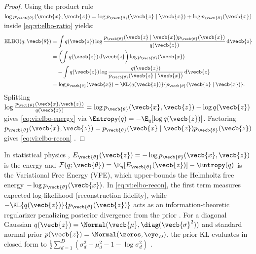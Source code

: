 \documentclass[../../../../master.tex]{subfiles}
\begin{document}
\begin{proof}
Using the product rule $\log p_{\vecb{\theta}}(\vecb{x}, \vecb{z}) = \log p_{\vecb{\theta}}(\vecb{z} \mid \vecb{x}) + \log p_{\vecb{\theta}}(\vecb{x})$ inside \eqref{eq:vi:elbo-ratio} yields:
\begin{align*}
  \mathrm{ELBO}(q; \vecb{\theta}) &= \int q(\vecb{z}) \log \frac{p_{\vecb{\theta}}(\vecb{z} \mid \vecb{x}) p_{\vecb{\theta}}(\vecb{x})}{q(\vecb{z})}\,\mathrm{d}\vecb{z} \\
  &= \left(\int q(\vecb{z})\,\mathrm{d}\vecb{z}\right) \log p_{\vecb{\theta}}(\vecb{x}) \\
  &\quad - \int q(\vecb{z}) \log \frac{q(\vecb{z})}{p_{\vecb{\theta}}(\vecb{z} \mid \vecb{x})}\,\mathrm{d}\vecb{z} \\
  &= \log p_{\vecb{\theta}}(\vecb{x}) - \KL{q(\vecb{z})}{p_{\vecb{\theta}}(\vecb{z} \mid \vecb{x})}.
\end{align*}
Splitting $\log \frac{p_{\vecb{\theta}}(\vecb{x}, \vecb{z})}{q(\vecb{z})} = \log p_{\vecb{\theta}}(\vecb{x}, \vecb{z}) - \log q(\vecb{z})$ gives \eqref{eq:vi:elbo-energy} via $\Entropy(q) = -\E_q[\log q(\vecb{z})]$. Factoring $p_{\vecb{\theta}}(\vecb{x}, \vecb{z}) = p_{\vecb{\theta}}(\vecb{x} \mid \vecb{z}) p_{\vecb{\theta}}(\vecb{z})$ gives \eqref{eq:vi:elbo-recon} .
\end{proof}


\begin{intuition}
In statistical physics , $E_{\vecb{\theta}}(\vecb{z}) = -\log p_{\vecb{\theta}}(\vecb{x}, \vecb{z})$ is the energy and $\mathcal{F}(q; \vecb{\theta}) = \E_q[E_{\vecb{\theta}}(\vecb{z})] - \Entropy(q)$ is the Variational Free Energy (VFE), which upper-bounds the Helmholtz free energy $-\log p_{\vecb{\theta}}(\vecb{x})$. In \eqref{eq:vi:elbo-recon}, the first term measures expected log-likelihood (reconstruction fidelity), while $-\KL{q(\vecb{z})}{p_{\vecb{\theta}}(\vecb{z})}$ acts as an information-theoretic regularizer penalizing posterior divergence from the prior . For a diagonal Gaussian $q(\vecb{z}) = \Normal(\vecb{\mu}, \diag(\vecb{\sigma}^2))$ and standard normal prior $p(\vecb{z}) = \Normal(\zeros, \eye_D)$, the prior KL evaluates in closed form to $\frac{1}{2}\sum_{d=1}^D (\sigma_d^2 + \mu_d^2 - 1 - \log \sigma_d^2)$  .
\end{intuition}
\end{document}

